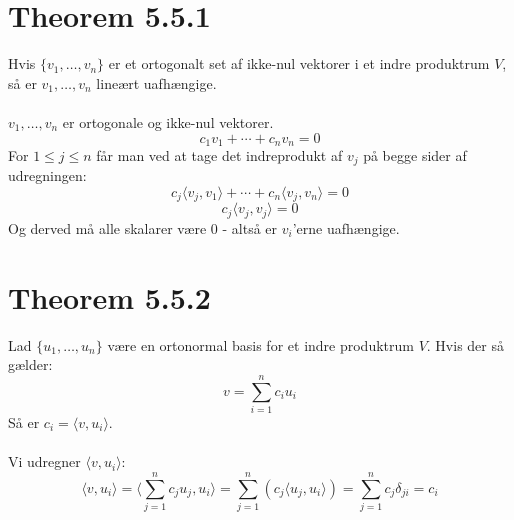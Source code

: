\documentclass[a4paper,oneside,article]{memoir}
\newcommand{\inner}[2]{\langle #1,#2 \rangle}
\begin{document}
	\section{Theorem 5.5.1}
	Hvis $\{v_1,\dots,v_n\}$ er et ortogonalt set af ikke-nul
	vektorer i et indre produktrum $V$, så er $v_1,\dots,v_n$ 
	lineært uafhængige.
	\\
	\\
	$v_1,\dots,v_n$ er ortogonale og ikke-nul vektorer.
	$$c_1v_1+\cdots+c_nv_n=0$$
	For $1\leq j \leq n$ får man ved at tage det indreprodukt
	af $v_j$ på begge sider af udregningen:
	$$c_j\inner{v_j}{v_1}+\cdots+c_n\inner{v_j}{v_n}=0$$
	$$c_j\inner{v_j}{v_j}=0$$
	Og derved må alle skalarer være 0 - altså er $v_i$'erne
	uafhængige.
	
	\section{Theorem 5.5.2}
	Lad $\{u_1,\dots,u_n\}$ være en ortonormal basis for et 
	indre produktrum $V$. Hvis der så gælder:
	$$v=\sum\limits_{i=1}^{n}c_iu_i$$
	Så er $c_i=\inner{v}{u_i}$.
	\\
	\\
	Vi udregner $\inner{v}{u_i}$:
	$$\inner{v}{u_i}=\inner{\sum\limits_{j=1}^{n}c_ju_j}{u_i}
	=\sum\limits_{j=1}^{n}(c_j\inner{u_j}{u_i})
	=\sum\limits_{j=1}^{n}c_j\delta_{ji}=c_i$$
	
\end{document}
